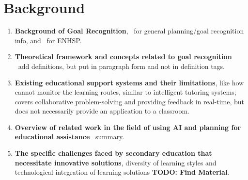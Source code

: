 \section{Background}
\begin{enumerate}
    \item \textbf{Background of Goal Recognition},~\citet{meneguzzi2021survey} for general planning/goal recognition info, and~\citet{Scala2016,ScalaHaslum2016} for ENHSP.
    \item \textbf{Theoretical framework and concepts related to goal recognition} \textemdash~add definitions, but put in paragraph form and not in definition tags.
    \item \textbf{Existing educational support systems and their limitations}, like how~\citet{Garrido2009} cannot monitor the learning routes, similar to intelligent tutoring systems;~\citet{Rojas2022} covers collaborative problem-solving and providing feedback in real-time, but does not necessarily provide an application to a classroom.
    \item \textbf{Overview of related work in the field of using AI and planning for educational assistance}~\cite{Castillo2009} summary.
    \item \textbf{The specific challenges faced by secondary education that necessitate innovative solutions}, diversity of learning styles and technological integration of learning solutions \textbf{TODO: Find Material}.
\end{enumerate}

